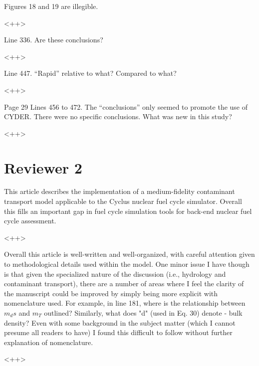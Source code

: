 \documentclass[answers,12pt]{exam}
\begin{document}
\begin{questions}
 

\question Figures 18 and 19 are illegible.
\begin{solution}
<++>
\end{solution}

 

\question Line 336. Are these conclusions?
\begin{solution}
<++>
\end{solution}

 

\question Line 447. “Rapid” relative to what? Compared to what?
\begin{solution}
<++>
\end{solution}

 

\question Page 29 Lines 456 to 472. The “conclusions” only seemed to promote the use of CYDER. There were no specific conclusions. What was new in this study? 
\begin{solution}
<++>
\end{solution}


\section*{Reviewer 2}

\question This article describes the implementation of a medium-fidelity contaminant transport model applicable to the Cyclus nuclear fuel cycle simulator. Overall this fills an important gap in fuel cycle simulation tools for back-end nuclear fuel cycle assessment.
\begin{solution}
<++>
\end{solution}

\question Overall this article is well-written and well-organized, with careful attention given to methodological details used within the model. One minor issue I have though is that given the specialized nature of the discussion (i.e., hydrology and contaminant transport), there are a number of areas where I feel the clarity of the manuscript could be improved by simply being more explicit with nomenclature used. For example, in line 181, where is the relationship between $m_ds$ and $m_T$ outlined? Similarly, what does "d" (used in Eq. 30) denote - bulk density? Even with some background in the subject matter (which I cannot presume all readers to have) I found this difficult to follow without further explanation of nomenclature.
\begin{solution}
<++>
\end{solution}


\end{questions}
\end{document}
